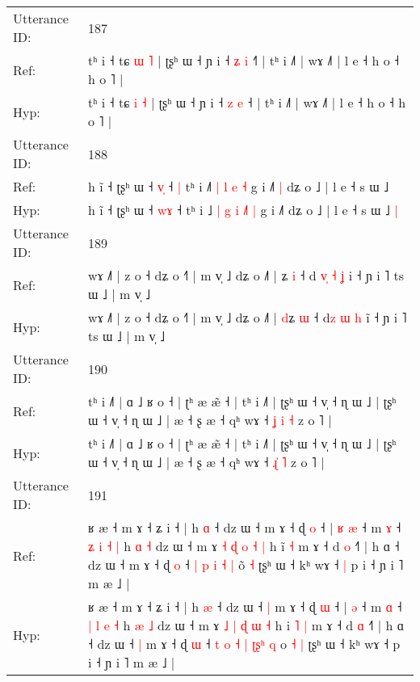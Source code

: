 \documentclass[10pt]{article}
\DeclareRobustCommand{\hl}[1]{{\textcolor{red}{#1}}}
\begin{document}
\begin{longtable}{ll}
 \\
\midrule
Utterance ID: & 187 \\
Ref: & tʰ i ˧ tɕ \hl{ɯ} \hl{˥} | ʈʂʰ ɯ ˧ ɲ i ˧ \hl{ʑ} \hl{i} ˧\hl{˥} | tʰ i ˩˥ | wɤ ˩˥ | l e ˧ h o ˧ h o ˥ |
 \\
Hyp: & tʰ i ˧ tɕ \hl{i} \hl{˧} | ʈʂʰ ɯ ˧ ɲ i ˧ \hl{z} \hl{e} ˧\hl{} | tʰ i ˩˥ | wɤ ˩˥ | l e ˧ h o ˧ h o ˥ |
 \\
\midrule
Utterance ID: & 188 \\
Ref: & h ĩ ˧ ʈʂʰ ɯ ˧ \hl{v}\hl{̩} ˧\hl{ }\hl{|} tʰ i ˩\hl{}\hl{˥} \hl{|} \hl{l} \hl{}\hl{e} \hl{˧} g i ˩˥\hl{ }\hl{|} dʑ o ˩ | l e ˧ s ɯ ˩\hl{}\hl{}
 \\
Hyp: & h ĩ ˧ ʈʂʰ ɯ ˧ \hl{w}\hl{ɤ} ˧\hl{}\hl{} tʰ i ˩\hl{ }\hl{|} \hl{g} \hl{i} \hl{˩}\hl{˥} \hl{|} g i ˩˥\hl{}\hl{} dʑ o ˩ | l e ˧ s ɯ ˩\hl{ }\hl{|}
 \\
\midrule
Utterance ID: & 189 \\
Ref: & wɤ ˩˥ | z o ˧ dʑ o ˧˥ | m v̩ ˩ dʑ o ˩˥ | \hl{}ʑ \hl{i} ˧ d\hl{ }\hl{v}\hl{̩} \hl{˧} \hl{ʝ} i\hl{} ˧ ɲ i ˥ ts ɯ ˩ | m v̩ ˩
 \\
Hyp: & wɤ ˩˥ | z o ˧ dʑ o ˧˥ | m v̩ ˩ dʑ o ˩˥ | \hl{d}ʑ \hl{ɯ} ˧ d\hl{}\hl{}\hl{z} \hl{ɯ} \hl{h} i\hl{̃} ˧ ɲ i ˥ ts ɯ ˩ | m v̩ ˩
 \\
\midrule
Utterance ID: & 190 \\
Ref: & tʰ i ˩˥ | ɑ ˩ ʁ o ˧ | ʈʰ æ æ̃ ˧ | tʰ i ˩˥ | ʈʂʰ ɯ ˧ v̩ ˧ ɳ ɯ ˩ | ʈʂʰ ɯ ˧ v̩ ˧ ɳ ɯ ˩ | æ ˧ ʂ æ ˧ qʰ wɤ ˧ \hl{ʝ}\hl{ }\hl{i} \hl{˧} z o ˥ |
 \\
Hyp: & tʰ i ˩˥ | ɑ ˩ ʁ o ˧ | ʈʰ æ æ̃ ˧ | tʰ i ˩˥ | ʈʂʰ ɯ ˧ v̩ ˧ ɳ ɯ ˩ | ʈʂʰ ɯ ˧ v̩ ˧ ɳ ɯ ˩ | æ ˧ ʂ æ ˧ qʰ wɤ ˧ \hl{}\hl{ɻ}\hl{̍} \hl{˥} z o ˥ |
 \\
\midrule
Utterance ID: & 191 \\
Ref: & ʁ æ ˧ m ɤ ˧ ʑ i ˧ | h \hl{ɑ} ˧ dz ɯ ˧\hl{}\hl{} m ɤ ˧ ɖ \hl{o} ˧ |\hl{ }\hl{ʁ} \hl{æ} ˧ m \hl{ɤ} ˧ \hl{ʑ} \hl{i} \hl{˧} \hl{|} h \hl{ɑ} \hl{˧} dz ɯ ˧ m ɤ \hl{˧} \hl{ɖ} \hl{o} \hl{˧} \hl{|} h i\hl{}\hl{̃} \hl{˧} m ɤ ˧ d \hl{o} ˧˥ | h ɑ ˧ dz ɯ ˧\hl{}\hl{} m ɤ ˧ ɖ \hl{o} ˧\hl{}\hl{} \hl{|} \hl{p} \hl{i} \hl{}\hl{}\hl{˧} \hl{|} o\hl{}\hl{̃} \hl{˧} ʈʂʰ ɯ ˧ kʰ wɤ ˧\hl{ }\hl{|} p i ˧ ɲ i ˥ m æ ˩ |
 \\
Hyp: & ʁ æ ˧ m ɤ ˧ ʑ i ˧ | h \hl{æ} ˧ dz ɯ ˧\hl{ }\hl{|} m ɤ ˧ ɖ \hl{ɯ} ˧ |\hl{}\hl{} \hl{ə} ˧ m \hl{ɑ} ˧ \hl{|} \hl{l} \hl{e} \hl{˧} h \hl{æ} \hl{˩} dz ɯ ˧ m ɤ \hl{˩} \hl{|} \hl{ɖ} \hl{ɯ} \hl{˧} h i\hl{ }\hl{˥} \hl{|} m ɤ ˧ d \hl{ɑ} ˧˥ | h ɑ ˧ dz ɯ ˧\hl{ }\hl{|} m ɤ ˧ ɖ \hl{ɯ} ˧\hl{ }\hl{t} \hl{o} \hl{˧} \hl{|} \hl{ʈ}\hl{ʂ}\hl{ʰ} \hl{q} o\hl{ }\hl{˧} \hl{|} ʈʂʰ ɯ ˧ kʰ wɤ ˧\hl{}\hl{} p i ˧ ɲ i ˥ m æ ˩ |

\end{longtable}
\end{document}
